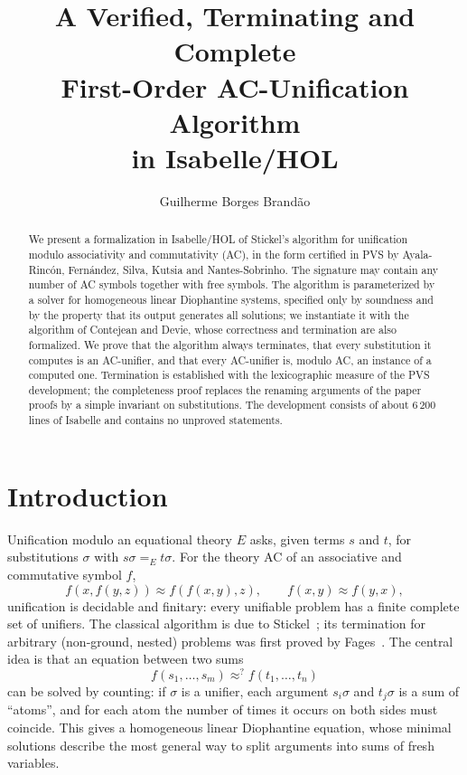 \documentclass[11pt,a4paper]{article}
\title{A Verified, Terminating and Complete\\ First-Order AC-Unification Algorithm\\ in Isabelle/HOL}
\author{Guilherme Borges Brand\~ao}
\date{}
\theoremstyle{definition}
\theoremstyle{remark}
\begin{document}
\maketitle

\begin{abstract}
  We present a formalization in Isabelle/HOL of Stickel's algorithm for unification modulo
  associativity and commutativity (AC), in the form certified in PVS by Ayala-Rinc\'on,
  Fern\'andez, Silva, Kutsia and Nantes-Sobrinho. The signature may contain any number of AC
  symbols together with free symbols. The algorithm is parameterized by a solver for homogeneous
  linear Diophantine systems, specified only by soundness and by the property that its output
  generates all solutions; we instantiate it with the algorithm of Contejean and Devie, whose
  correctness and termination are also formalized. We prove that the algorithm always
  terminates, that every substitution it computes is an AC-unifier, and that every AC-unifier is,
  modulo AC, an instance of a computed one. Termination is established with the lexicographic
  measure of the PVS development; the completeness proof replaces the renaming arguments of the
  paper proofs by a simple invariant on substitutions. The development consists of about 6\,200
  lines of Isabelle and contains no unproved statements.
\end{abstract}

\tableofcontents

\section{Introduction}

Unification modulo an equational theory $E$ asks, given terms $s$ and $t$, for substitutions
$\sigma$ with $s\sigma =_E t\sigma$. For the theory AC of an associative and commutative symbol
$f$,
\[
  f(x, f(y, z)) \approx f(f(x, y), z), \qquad f(x, y) \approx f(y, x),
\]
unification is decidable and finitary: every unifiable problem has a finite complete set of
unifiers. The classical algorithm is due to Stickel~\cite{Stickel81}; its termination for
arbitrary (non-ground, nested) problems was first proved by Fages~\cite{Fages87}. The central idea
is that an equation between two sums
\[
  f(s_1, \dots, s_m) \approx^? f(t_1, \dots, t_n)
\]
can be solved by counting: if $\sigma$ is a unifier, each argument $s_i\sigma$ and $t_j\sigma$ is a
sum of ``atoms'', and for each atom the number of times it occurs on both sides must coincide. This
gives a homogeneous linear Diophantine equation, whose minimal solutions describe the most general
way to split arguments into sums of fresh variables.
\end{document}
